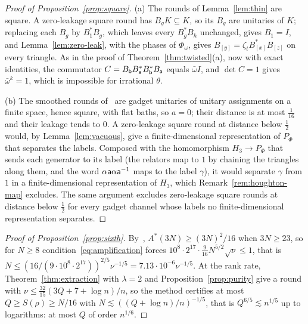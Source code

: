 \begin{proof}[Proof of Proposition~\ref{prop:square}]
(a) The rounds of Lemma~\ref{lem:thin} are square. A zero-leakage square round has $B_gK\subseteq K$, so its $B_g$ are unitaries of $K$; replacing each $B_g$ by $B_1^*B_g$, which leaves every
$B_g^*B_h$ unchanged, gives $B_1=I$, and
Lemma~\ref{lem:zero-leak}, with the phases of $\Phi_\omega$, gives $B_{[y]}=\zeta_tB_{[x]}^*B_{[z]}$ on every triangle. As in the proof of Theorem~\ref{thm:twisted}(a), now with exact
identities, the commutator $C=B_\mathsf b B_\mathsf a^*B_\mathsf b^*B_\mathsf a$ equals $\bar\omega I$, and $\det C=1$ gives $\bar\omega^k=1$, which is impossible for irrational $\theta$.

(b) The smoothed rounds of~\cite[Proposition~4.14]{DouglasMghirbiB} are gadget unitaries of unitary assignments on a finite space, hence square, with flat baths, so $a=0$; their
distance is at most $\frac1{16}$ and their leakage tends to $0$. A zero-leakage square round at distance below $\frac12$ would, by Lemma~\ref{lem:vacuous}, give a finite-dimensional
representation of $P_\Phi$ that separates the labels. Composed with the homomorphism $H_3\to P_\Phi$ that sends each generator to its label (the relators map to $1$ by chaining
the triangles along them, and the word $\alpha\mathsf a\alpha\mathsf a^{-1}$ maps to the label $\gamma$), it would separate $\gamma$ from $1$ in a finite-dimensional representation of $H_3$,
which Remark~\ref{rem:houghton-map} excludes. The same argument excludes zero-leakage square rounds at distance below
$\frac12$ for every gadget channel whose labels no finite-dimensional representation separates.
\end{proof}

\begin{proof}[Proof of Proposition~\ref{prop:sixth}]
By~\cite[Proposition~4.4]{DouglasMghirbiB}, $A^*(3N)\ge(3N)^2/16$ when $3N\ge23$, so for $N\ge8$ condition~\eqref{eq:amplification} forces
$10^8\cdot2^{17}\cdot\frac9{16}N^{5/2}\sqrt\nu\le1$, that is $N\le(16/(9\cdot10^8\cdot2^{17}))^{2/5}\nu^{-1/5}=7.13\cdot10^{-6}\nu^{-1/5}$. At the rank rate, Theorem~\ref{thm:extraction}
with $\lambda=2$ and Proposition~\ref{prop:purity} give a round with $\nu\le\frac{32}{15}(3Q+7+\log n)/n$, so the method certifies at most $Q\ge S(\rho)\ge N/16$ with
$N\lesssim((Q+\log n)/n)^{-1/5}$, that is $Q^{6/5}\lesssim n^{1/5}$ up to logarithms: at most $Q$ of order $n^{1/6}$.
\end{proof}
